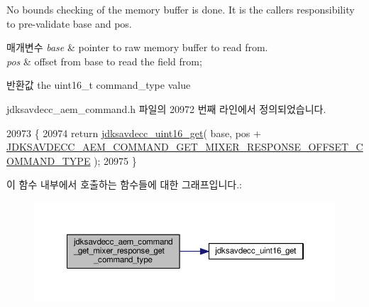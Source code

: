No bounds checking of the memory buffer is done. It is the caller\textquotesingle{}s responsibility to pre-\/validate base and pos.


\begin{DoxyParams}{매개변수}
{\em base} & pointer to raw memory buffer to read from. \\
\hline
{\em pos} & offset from base to read the field from; \\
\hline
\end{DoxyParams}
\begin{DoxyReturn}{반환값}
the uint16\+\_\+t command\+\_\+type value 
\end{DoxyReturn}


jdksavdecc\+\_\+aem\+\_\+command.\+h 파일의 20972 번째 라인에서 정의되었습니다.


\begin{DoxyCode}
20973 \{
20974     \textcolor{keywordflow}{return} \hyperlink{group__endian_ga3fbbbc20be954aa61e039872965b0dc9}{jdksavdecc\_uint16\_get}( base, pos + 
      \hyperlink{group__command__get__mixer__response_ga369ce4627a9907a90e957da73f662d8e}{JDKSAVDECC\_AEM\_COMMAND\_GET\_MIXER\_RESPONSE\_OFFSET\_COMMAND\_TYPE}
       );
20975 \}
\end{DoxyCode}


이 함수 내부에서 호출하는 함수들에 대한 그래프입니다.\+:
\nopagebreak
\begin{figure}[H]
\begin{center}
\leavevmode
\includegraphics[width=350pt]{group__command__get__mixer__response_gaca655b7e19d95144abee869ed3b24893_cgraph}
\end{center}
\end{figure}


